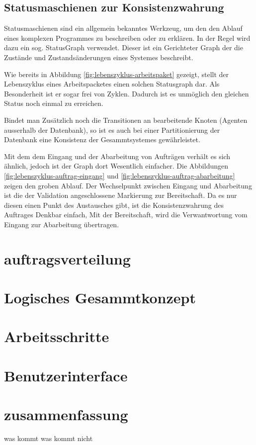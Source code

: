 \subsection{Statusmaschienen zur Konsistenzwahrung}

\nocite{statechart}

Statusmaschienen sind ein allgemein bekanntes Werkzeug,
um den den Ablauf eines komplexen Programmes zu beschreiben oder zu erkl\"aren.
In der Regel wird dazu ein sog. StatusGraph verwendet.
Dieser ist ein Gerichteter Graph der die Zust\"ande und Zustands\"anderungen eines Systemes beschreibt.

Wie bereits in Abbildung \ref{fig:lebenszyklus-arbeitspaket} gezeigt,
stellt der Lebenszyklus eines Arbeitspacketes einen solchen Statusgraph dar.
Als Besonderheit ist er sogar frei von Zyklen.
Dadurch ist es unm\"oglich den gleichen Status noch einmal zu erreichen.

Bindet man Zus\"atzlich noch die Transitionen an bearbeitende Knoten (Agenten ausserhalb der Datenbank),
so ist es auch bei einer Partitionierung der Datenbank eine Konsistenz der Gesammtsystemes gew\"ahrleistet.



Mit dem dem Eingang und der Abarbeitung von Auftr\"agen verh\"alt es sich \"ahnlich,
jedoch ist der Graph dort Wesentlich einfacher.
Die Abbildungen \ref{fig:lebenszyklus-auftrag-eingang} und \ref{fig:lebenszyklus-auftrag-abarbeitung} zeigen den groben Ablauf.
Der Wechselpunkt zwischen Eingang und Abarbeitung ist die der Validation angeschlossene Markierung zur Bereitschaft.
Da es nur diesen einen Punkt des Austausches gibt, ist die Konsistenzwahrung des Auftrages Denkbar einfach,
Mit der Bereitschaft, wird die Verwantwortung vom Eingang zur Abarbeitung \"ubertragen.


\section{auftragsverteilung}

\section{Logisches Gesammtkonzept}


\section{Arbeitsschritte}

\section{Benutzerinterface}



\section{zusammenfassung}

was kommt
was kommt nicht
